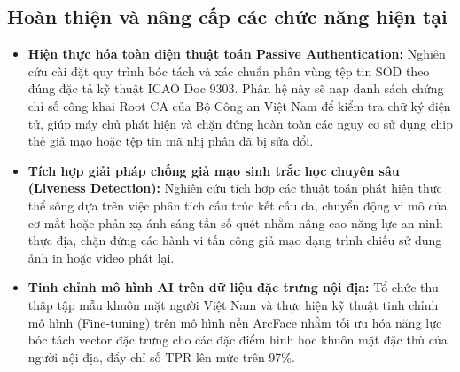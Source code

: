 ﻿\documentclass[../DoAn.tex]{subfiles}
\begin{document}
\subsection{Hoàn thiện và nâng cấp các chức năng hiện tại}
\begin{itemize}
    \item \textbf{Hiện thực hóa toàn diện thuật toán Passive Authentication:} Nghiên cứu cài đặt quy trình bóc tách và xác chuẩn phân vùng tệp tin SOD theo đúng đặc tả kỹ thuật ICAO Doc 9303. Phân hệ này sẽ nạp danh sách chứng chỉ số công khai Root CA của Bộ Công an Việt Nam để kiểm tra chữ ký điện tử, giúp máy chủ phát hiện và chặn đứng hoàn toàn các nguy cơ sử dụng chip thẻ giả mạo hoặc tệp tin mã nhị phân đã bị sửa đổi.
    \item \textbf{Tích hợp giải pháp chống giả mạo sinh trắc học chuyên sâu (Liveness Detection):} Nghiên cứu tích hợp các thuật toán phát hiện thực thể sống dựa trên việc phân tích cấu trúc kết cấu da, chuyển động vi mô của cơ mắt hoặc phản xạ ánh sáng tần số quét nhằm nâng cao năng lực an ninh thực địa, chặn đứng các hành vi tấn công giả mạo dạng trình chiếu sử dụng ảnh in hoặc video phát lại.
    \item \textbf{Tinh chỉnh mô hình AI trên dữ liệu đặc trưng nội địa:} Tổ chức thu thập tập mẫu khuôn mặt người Việt Nam và thực hiện kỹ thuật tinh chỉnh mô hình (Fine-tuning) trên mô hình nền ArcFace nhằm tối ưu hóa năng lực bóc tách vector đặc trưng cho các đặc điểm hình học khuôn mặt đặc thù của người nội địa, đẩy chỉ số TPR lên mức trên 97\%.
\end{itemize}
\end{document}
